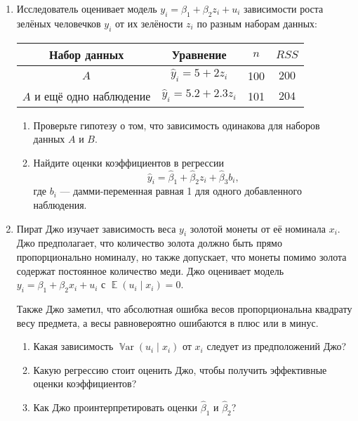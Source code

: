 \documentclass[12pt]{article}
\DeclareMathOperator{\E}{\mathbb{E}}
\DeclareMathOperator{\Var}{\mathbb{V}ar}
\begin{document}
\newpage
\begin{enumerate}
    \item Исследователь оценивает модель $y_i = \beta_1 + \beta_2 z_i + u_i$ зависимости 
    роста зелёных человечков $y_i$ от их зелёности $z_i$ по разным наборам данных:

    \begin{tabular}{cccc}
        \toprule 
        Набор данных & Уравнение & $n$ & $RSS$ \\
        \midrule
        $A$ & $\hat y_i = 5 + 2 z_i$ & 100 & $200$ \\
        $A$ и ещё одно наблюдение & $\hat y_i = 5.2 + 2.3 z_i$ & 101 & $204$ \\
        \bottomrule
    \end{tabular}

    \begin{enumerate}
        \item Проверьте гипотезу о том, что зависимость одинакова для наборов данных $A$ и $B$.
        
        \item Найдите оценки коэффициентов в регрессии 
        \[
        \hat y_i = \hat\beta_1 + \hat\beta_2 z_i + \hat\beta_3 b_i,
        \]
        где $b_i$ — дамми-переменная равная 1 для одного добавленного наблюдения.
        
    \end{enumerate}

    \item Пират Джо изучает зависимость веса $y_i$ золотой монеты от её номинала $x_i$. 
    Джо предполагает, что количество золота должно быть прямо пропорционально номиналу,
    но также допускает, что монеты помимо золота содержат постоянное количество меди.
    Джо оценивает модель $y_i = \beta_1 + \beta_2 x_i + u_i$ с $\E(u_i \mid x_i) = 0$.

    Также Джо заметил, что абсолютная ошибка весов пропорциональна квадрату весу предмета,
    а весы равновероятно ошибаются в плюс или в минус. 
    \begin{enumerate}
        \item Какая зависимость $\Var(u_i \mid x_i)$ от $x_i$ следует из предположений Джо?
        \item Какую регрессию стоит оценить Джо, чтобы получить эффективные оценки коэффициентов?
        \item Как Джо проинтерпретировать оценки $\hat\beta_1$ и $\hat\beta_2$?
    \end{enumerate}
    

\end{enumerate}
\end{document}

